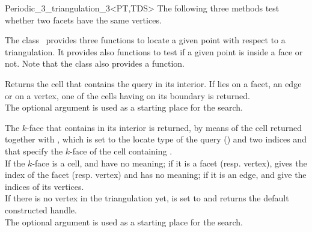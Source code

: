 \begin{ccRefClass}{Periodic_3_triangulation_3<PT,TDS>}
The following three methods test whether two facets have the same
vertices.

{}
\ccGlue
{}
{}
\ccGlue
{}
{}



The class \ccClassTemplateName\  provides three functions to locate
a given point with respect to a triangulation. It provides
also functions to test if a given point is inside a face
or not.  Note that the class  also
provides a  function.

{
Returns the cell that contains the query in its interior. If
 lies on a facet, an edge or on a vertex, one of the cells
having  on its boundary is returned.\\ 
The optional argument  is used as a starting place for the
search.
}

{The $k$-face that contains  in its interior is
returned, by means of the cell returned together with , which
is set to the locate type of the query () and two indices  and  that
specify the $k$-face of the cell containing .\\ 
If the $k$-face is a cell,  and  have no
meaning; if it is a facet (resp. vertex),  gives the index of
the facet (resp. vertex) and  has no meaning; if it is an
edge,  and  give the indices of its vertices.\\ 
If there is no vertex in the triangulation yet,  is set to
 and  returns the default constructed handle.\\ 
The optional argument  is used as a starting place for the
search.
}


\end{ccRefClass}
